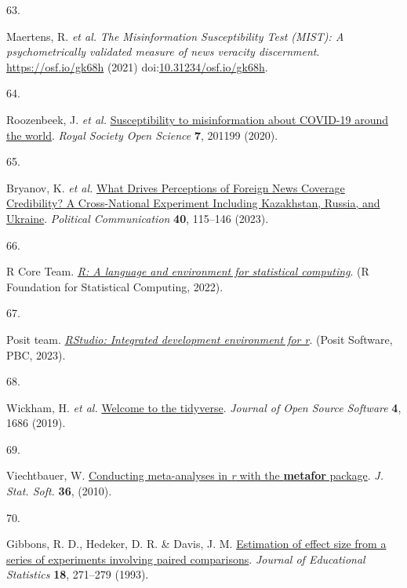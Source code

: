 \documentclass[
  doc,floatsintext]{apa6}
\newlength{\cslhangindent}
\newlength{\csllabelwidth}
\newenvironment{CSLReferences}[2] %
 {\begin{list}{}{%
  \setlength{\itemindent}{0pt}
  \setlength{\leftmargin}{0pt}
  \setlength{\parsep}{0pt}
  \ifodd #1
   \setlength{\leftmargin}{\cslhangindent}
   \setlength{\itemindent}{-1\cslhangindent}
  \fi
  \setlength{\itemsep}{#2\baselineskip}}}
 {\end{list}}
\newcommand{\CSLLeftMargin}[1]{\parbox[t]{\csllabelwidth}{\strut#1\strut}}
\newcommand{\CSLRightInline}[1]{\parbox[t]{\linewidth - \csllabelwidth}{\strut#1\strut}}
\begin{document}
\begin{CSLReferences}{0}{0}
\CSLLeftMargin{63. }%
\CSLRightInline{*Maertens, R. \emph{et al.} \emph{The Misinformation Susceptibility Test (MIST): A psychometrically validated measure of news veracity discernment}. \url{https://osf.io/gk68h} (2021) doi:\href{https://doi.org/10.31234/osf.io/gk68h}{10.31234/osf.io/gk68h}.}

\CSLLeftMargin{64. }%
\CSLRightInline{*Roozenbeek, J. \emph{et al.} \href{https://doi.org/10.1098/rsos.201199}{Susceptibility to misinformation about COVID-19 around the world}. \emph{Royal Society Open Science} \textbf{7}, 201199 (2020).}

\CSLLeftMargin{65. }%
\CSLRightInline{*Bryanov, K. \emph{et al.} \href{https://doi.org/10.1080/10584609.2023.2172492}{What Drives Perceptions of Foreign News Coverage Credibility? A Cross-National Experiment Including Kazakhstan, Russia, and Ukraine}. \emph{Political Communication} \textbf{40}, 115--146 (2023).}

\CSLLeftMargin{66. }%
\CSLRightInline{R Core Team. \emph{\href{https://www.R-project.org/}{R: A language and environment for statistical computing}}. (R Foundation for Statistical Computing, 2022).}

\CSLLeftMargin{67. }%
\CSLRightInline{Posit team. \emph{\href{http://www.posit.co/}{RStudio: Integrated development environment for r}}. (Posit Software, PBC, 2023).}

\CSLLeftMargin{68. }%
\CSLRightInline{Wickham, H. \emph{et al.} \href{https://doi.org/10.21105/joss.01686}{Welcome to the tidyverse}. \emph{Journal of Open Source Software} \textbf{4}, 1686 (2019).}

\CSLLeftMargin{69. }%
\CSLRightInline{Viechtbauer, W. \href{https://doi.org/10.18637/jss.v036.i03}{Conducting meta-analyses in \emph{r} with the \textbf{metafor} package}. \emph{J. Stat. Soft.} \textbf{36}, (2010).}

\CSLLeftMargin{70. }%
\CSLRightInline{Gibbons, R. D., Hedeker, D. R. \& Davis, J. M. \href{https://doi.org/10.3102/10769986018003271}{Estimation of effect size from a series of experiments involving paired comparisons}. \emph{Journal of Educational Statistics} \textbf{18}, 271--279 (1993).}


\end{CSLReferences}
\end{document}
